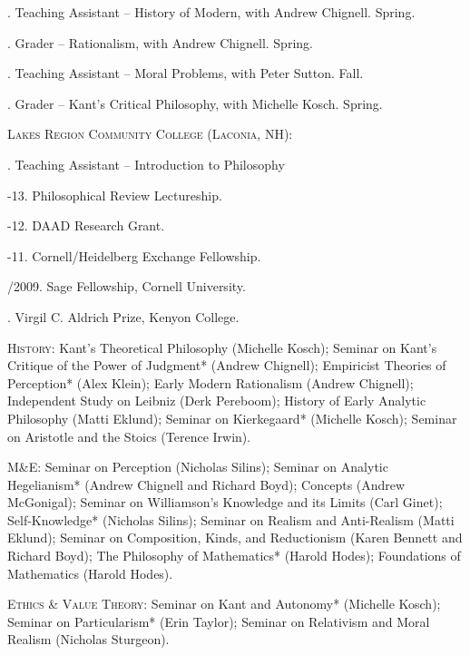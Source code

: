 \documentclass[11pt]{article}
\begin{document}
. Teaching Assistant -- History of Modern, with Andrew Chignell. Spring.

. Grader -- Rationalism, with Andrew Chignell. Spring.

. Teaching Assistant -- Moral Problems, with Peter Sutton. Fall.

. Grader -- Kant’s Critical Philosophy, with Michelle Kosch. Spring.
\medskip

\noindent \textsc{Lakes Region Community College (Laconia, NH):}
\medskip

. Teaching Assistant – Introduction to Philosophy

\bigskip


\medskip

-13. Philosophical Review Lectureship.

-12. DAAD Research Grant.

-11. Cornell/Heidelberg Exchange Fellowship.

/2009. Sage Fellowship, Cornell University.

. Virgil C. Aldrich Prize, Kenyon College.

\bigskip


\ind \textsc{History}: Kant’s Theoretical Philosophy (Michelle Kosch); Seminar on Kant’s Critique of the Power of Judgment* (Andrew Chignell); Empiricist Theories of Perception* (Alex Klein); Early Modern Rationalism (Andrew Chignell); Independent Study on Leibniz (Derk Pereboom); History of Early Analytic Philosophy (Matti Eklund); Seminar on Kierkegaard* (Michelle Kosch); Seminar on Aristotle and the Stoics (Terence Irwin).

\ind \textsc{M\&E}: Seminar on Perception (Nicholas Silins); Seminar on Analytic Hegelianism* (Andrew Chignell and Richard Boyd); Concepts (Andrew McGonigal); Seminar on Williamson’s Knowledge and its Limits (Carl Ginet); Self-Knowledge* (Nicholas Silins); Seminar on Realism and Anti-Realism (Matti Eklund); Seminar on Composition, Kinds, and Reductionism (Karen Bennett and Richard Boyd); The Philosophy of Mathematics* (Harold Hodes); Foundations of Mathematics (Harold Hodes).

\ind \textsc{Ethics \& Value Theory}: Seminar on Kant and Autonomy* (Michelle Kosch); Seminar on Particularism* (Erin Taylor); Seminar on Relativism and Moral Realism (Nicholas Sturgeon). 
\medskip
\end{document}
